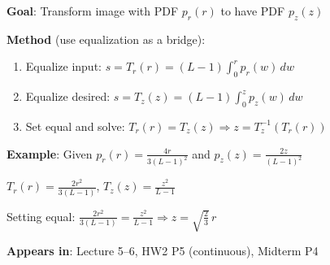 \documentclass[10pt]{article}
\begin{document}

\begin{conceptbox}

\begin{formulabox}
\textbf{Goal}: Transform image with PDF $p_r(r)$ to have PDF $p_z(z)$

\textbf{Method} (use equalization as a bridge):
\begin{enumerate}[leftmargin=1.5em, itemsep=0pt, topsep=2pt]
    \item Equalize input: $s = T_r(r) = (L-1)\int_0^r p_r(w)\,dw$
    \item Equalize desired: $s = T_z(z) = (L-1)\int_0^z p_z(w)\,dw$
    \item Set equal and solve: $T_r(r) = T_z(z) \Rightarrow z = T_z^{-1}(T_r(r))$
\end{enumerate}
\end{formulabox}

\begin{examplebox}
\textbf{Example}: Given $p_r(r) = \frac{4r}{3(L-1)^2}$ and $p_z(z) = \frac{2z}{(L-1)^2}$

$T_r(r) = \frac{2r^2}{3(L-1)}$, \quad $T_z(z) = \frac{z^2}{L-1}$

Setting equal: $\frac{2r^2}{3(L-1)} = \frac{z^2}{L-1} \Rightarrow z = \sqrt{\frac{2}{3}}\,r$
\end{examplebox}

\textbf{Appears in}: Lecture 5--6, HW2 P5 (continuous), Midterm P4

\end{conceptbox}

\end{document}
